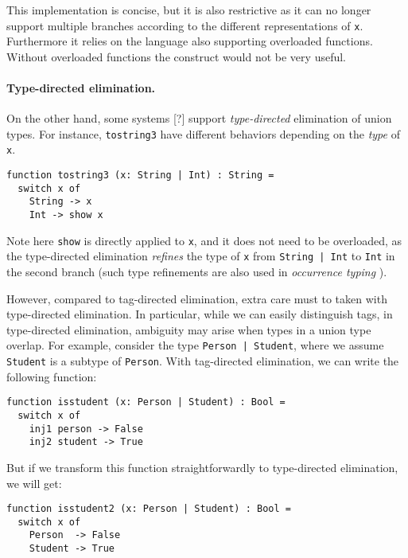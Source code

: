 This implementation is concise, but it is also restrictive as it can no longer
support multiple branches according to the different representations of
\lstinline{x}. Furthermore it relies on the language also supporting overloaded
functions. Without overloaded functions the construct would not be very useful.

\paragraph{Type-directed elimination.}

On the other hand, some systems [?] support \textit{type-directed} elimination
of union types. For instance, \lstinline{tostring3} have different behaviors
depending on the \textit{type} of \lstinline{x}.

\begin{lstlisting}
function tostring3 (x: String | Int) : String =
  switch x of
    String -> x
    Int -> show x
\end{lstlisting}

\noindent Note here \lstinline{show} is directly applied to \lstinline{x}, and
it does not need to be overloaded, as the type-directed elimination
\textit{refines} the type of \lstinline{x} from \lstinline{String | Int} to
\lstinline{Int} in the second branch (such type refinements are also used in
\textit{occurrence typing} \cite{Tobin:typedscheme}).

However, compared to tag-directed elimination, extra care must to taken with
type-directed elimination. In particular, while we can easily distinguish tags,
in type-directed elimination, ambiguity may arise when types in a union type
overlap. For example, consider the type \lstinline{Person | Student}, where we
assume \lstinline{Student} is a subtype of \lstinline{Person}. With tag-directed
elimination, we can write the following function:

\begin{lstlisting}
function isstudent (x: Person | Student) : Bool =
  switch x of
    inj1 person -> False
    inj2 student -> True
\end{lstlisting}

But if we transform this function straightforwardly to type-directed
elimination, we will get:

\begin{lstlisting}
function isstudent2 (x: Person | Student) : Bool =
  switch x of
    Person  -> False
    Student -> True
\end{lstlisting}

